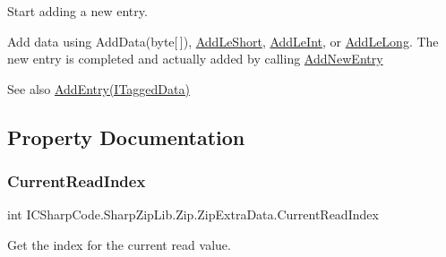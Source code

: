 Start adding a new entry. 

Add data using Add\+Data(byte\mbox{[}$\,$\mbox{]}), \hyperlink{class_i_c_sharp_code_1_1_sharp_zip_lib_1_1_zip_1_1_zip_extra_data_acc356859af6fe44b71ca605473385dec}{Add\+Le\+Short}, \hyperlink{class_i_c_sharp_code_1_1_sharp_zip_lib_1_1_zip_1_1_zip_extra_data_ac688733a0684d0e2a32da357d444212a}{Add\+Le\+Int}, or \hyperlink{class_i_c_sharp_code_1_1_sharp_zip_lib_1_1_zip_1_1_zip_extra_data_aafc11e296c9769e11ddfbc07dee754e7}{Add\+Le\+Long}. The new entry is completed and actually added by calling \hyperlink{class_i_c_sharp_code_1_1_sharp_zip_lib_1_1_zip_1_1_zip_extra_data_aba673aeb5ed08038a5c76377c0607ca9}{Add\+New\+Entry}

\begin{DoxySeeAlso}{See also}
\hyperlink{class_i_c_sharp_code_1_1_sharp_zip_lib_1_1_zip_1_1_zip_extra_data_a86f3cb0b8dcd274f0bc84d75e06ba703}{Add\+Entry(\+I\+Tagged\+Data)}


\end{DoxySeeAlso}


\subsection{Property Documentation}
\mbox{\label{class_i_c_sharp_code_1_1_sharp_zip_lib_1_1_zip_1_1_zip_extra_data_a7444c45305d5bc46bd2ca2cba71a9ea0}} 
\subsubsection{\texorpdfstring{Current\+Read\+Index}{CurrentReadIndex}}
{\footnotesize\ttfamily int I\+C\+Sharp\+Code.\+Sharp\+Zip\+Lib.\+Zip.\+Zip\+Extra\+Data.\+Current\+Read\+Index\hspace{0.3cm}{\ttfamily [get]}}



Get the index for the current read value. 

